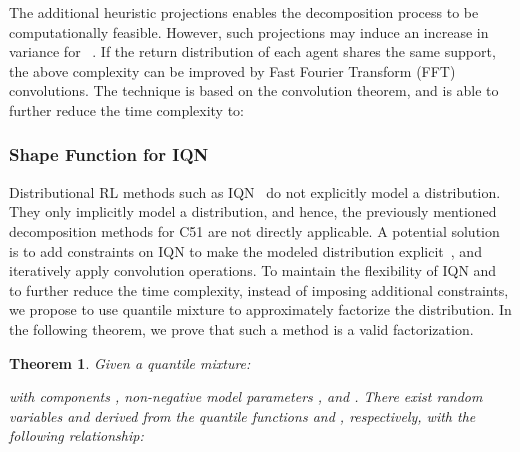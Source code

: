 \documentclass[twoside,11pt]{article}
\newcounter{theorem0}
\newtheorem{theorem}[theorem0]{Theorem}
\begin{document}
The additional heuristic projections enables the decomposition process to be computationally feasible. However, such projections may induce an increase in variance for ~\citep{Rowland2019ER-DQN}. If the return distribution of each agent shares the same support, the above  complexity can be improved by Fast Fourier Transform (FFT) convolutions. The technique is based on the convolution theorem, and is able to further reduce the time complexity to:

\subsubsection{Shape Function for IQN}

Distributional RL methods such as IQN~\citep{Dabney2018IQN} do not explicitly model a distribution. They only implicitly model a distribution, and hence, the previously mentioned decomposition methods for C51 are not directly applicable. A potential solution is to add constraints on IQN to make the modeled distribution explicit~\citep{Yang2019FQF}, and iteratively apply convolution operations. To maintain the flexibility of IQN and to further reduce the time complexity, instead of imposing additional constraints, we propose to use quantile mixture to approximately factorize the distribution. In the following theorem, we prove that such a method is a valid factorization.
\begin{theorem}
\label{thm:sum_of_rv}
Given a quantile mixture:

with  components , non-negative model parameters , and . There exist random variables  and  derived from the quantile functions  and , respectively, with the following relationship:


\end{theorem}
\end{document}
